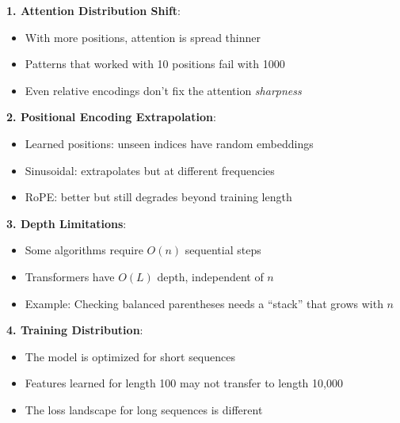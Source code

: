 \begin{remark}
    \textbf{1. Attention Distribution Shift}:
    \begin{itemize}
        \item With more positions, attention is spread thinner
        \item Patterns that worked with 10 positions fail with 1000
        \item Even relative encodings don't fix the attention \emph{sharpness}
    \end{itemize}

    \textbf{2. Positional Encoding Extrapolation}:
    \begin{itemize}
        \item Learned positions: unseen indices have random embeddings
        \item Sinusoidal: extrapolates but at different frequencies
        \item RoPE: better but still degrades beyond training length
    \end{itemize}

    \textbf{3. Depth Limitations}:
    \begin{itemize}
        \item Some algorithms require $O(n)$ sequential steps
        \item Transformers have $O(L)$ depth, independent of $n$
        \item Example: Checking balanced parentheses needs a ``stack'' that grows with $n$
    \end{itemize}

    \textbf{4. Training Distribution}:
    \begin{itemize}
        \item The model is optimized for short sequences
        \item Features learned for length 100 may not transfer to length 10,000
        \item The loss landscape for long sequences is different
    \end{itemize}
\end{remark}

